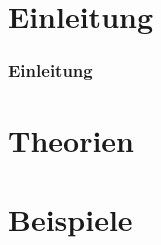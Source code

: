 
%
%

\section{Einleitung}

\begin{frame}[<+->]
    \frametitle{Einleitung}
\end{frame}


\section{Theorien}

\section{Beispiele}

